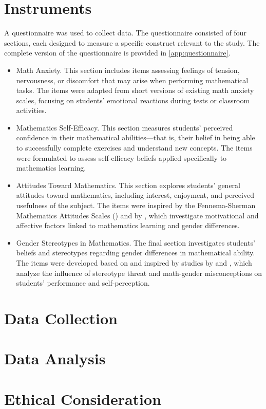 \section{Instruments}\label{sec:Instruments}
A questionnaire was used to collect data. 
The questionnaire consisted of four sections, each designed to measure a specific construct relevant to the study. The complete version of the questionnaire is provided in \autoref{app:questionnaire}.
\begin{itemize}
    \item Math Anxiety.
    This section includes items assessing feelings of tension, nervousness, or discomfort that may arise when performing mathematical tasks. The items were adapted from short versions of existing math anxiety scales, focusing on students’ emotional reactions during tests or classroom activities.
    \item Mathematics Self-Efficacy. 
    This section measures students’ perceived confidence in their mathematical abilities—that is, their belief in being able to successfully complete exercises and understand new concepts. The items were formulated to assess self-efficacy beliefs applied specifically to mathematics learning.
    \item Attitudes Toward Mathematics.
    This section explores students’ general attitudes toward mathematics, including interest, enjoyment, and perceived usefulness of the subject. The items were inspired by the Fennema-Sherman Mathematics Attitudes Scales (\cite{FennemaSherman1976}) and by \textcite{Passolunghi2014}, which investigate motivational and affective factors linked to mathematics learning and gender differences.
    \item Gender Stereotypes in Mathematics.
    The final section investigates students’ beliefs and stereotypes regarding gender differences in mathematical ability. The items were developed based on and inspired by studies by \textcite{Bedynska2021} and \textcite{Dersch2022}, which analyze the influence of stereotype threat and math-gender misconceptions on students’ performance and self-perception.
\end{itemize}


\section{Data Collection}
\section{Data Analysis}
\section{Ethical Consideration}